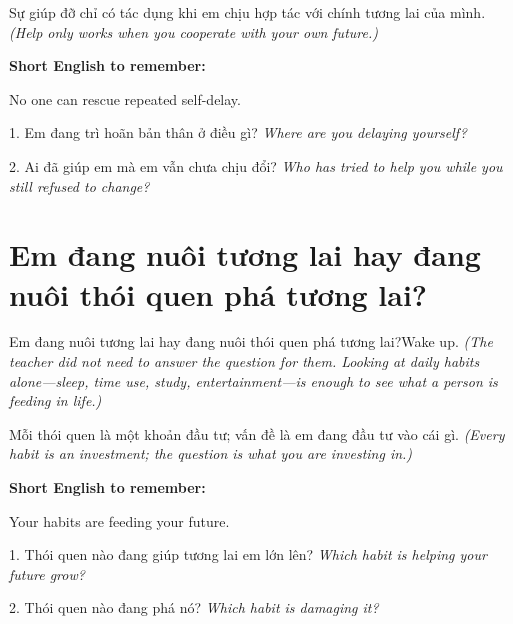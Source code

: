 \begin{baihoc}
Sự giúp đỡ chỉ có tác dụng khi em chịu hợp tác với chính tương lai của mình.
\textit{(Help only works when you cooperate with your own future.)}
\end{baihoc}

\begin{ghinhoanh}
\textbf{Short English to remember:}

No one can rescue repeated self-delay.

\end{ghinhoanh}

\begin{tuhocnhanh}
1. Em đang trì hoãn bản thân ở điều gì? \textit{Where are you delaying yourself?}

2. Ai đã giúp em mà em vẫn chưa chịu đổi? \textit{Who has tried to help you while you still refused to change?}
\end{tuhocnhanh}
\ngancach

\section{Em đang nuôi tương lai hay đang nuôi thói quen phá tương lai?}
\begin{truyen}{Em đang nuôi tương lai hay đang nuôi thói quen phá tương lai?}{Wake up.}
\textit{(The teacher did not need to answer the question for them. Looking at daily habits alone—sleep, time use, study, entertainment—is enough to see what a person is feeding in life.)}
\end{truyen}

\begin{baihoc}
Mỗi thói quen là một khoản đầu tư; vấn đề là em đang đầu tư vào cái gì.
\textit{(Every habit is an investment; the question is what you are investing in.)}
\end{baihoc}

\begin{ghinhoanh}
\textbf{Short English to remember:}

Your habits are feeding your future.

\end{ghinhoanh}

\begin{tuhocnhanh}
1. Thói quen nào đang giúp tương lai em lớn lên? \textit{Which habit is helping your future grow?}

2. Thói quen nào đang phá nó? \textit{Which habit is damaging it?}
\end{tuhocnhanh}
\ngancach

